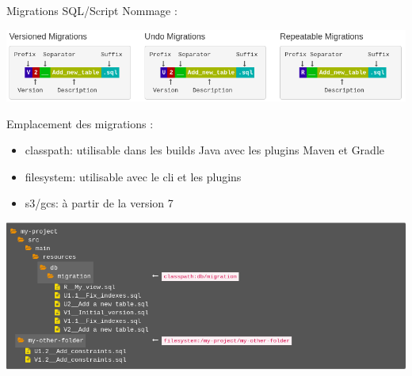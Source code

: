 \documentclass[slidestop,compress,11pt,xcolor=dvipsnames,french]{beamer}
\begin{document}
\begin{frame}{Migrations SQL/Script}
Nommage :
\begin{center}
 \includegraphics[scale=0.3]{nommage_sql.png}
\end{center}

Emplacement des migrations :
\begin{itemize}
 \item classpath: utilisable dans les builds Java avec les plugins Maven et Gradle
 \item filesystem: utilisable avec le cli et les plugins
 \item s3/gcs: à partir de la version 7
\end{itemize}

\begin{center}
 \includegraphics[scale=0.2,keepaspectratio=true]{locations_sql.png}
\end{center}
\end{frame}
\end{document}
